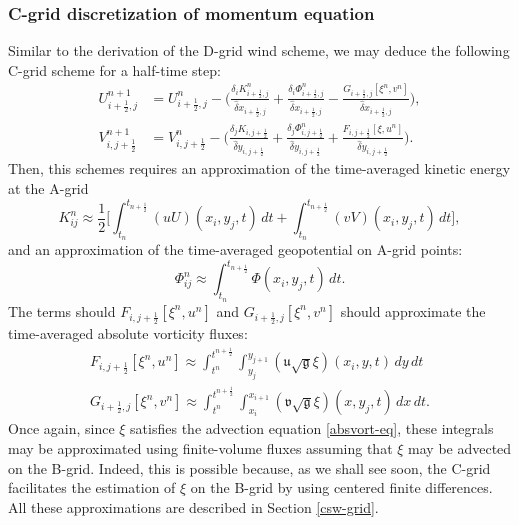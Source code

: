 \subsubsection{C-grid discretization of momentum equation }
Similar to the derivation of the D-grid wind scheme, we may deduce the following C-grid scheme for a half-time step:
\begin{align}
	\label{2d-sweq-cscheme-u}
	{U}_{i+\frac{1}{2},j}^{n+1}&=
	{U}_{i+\frac{1}{2},j}^{n} - \bigg(
	\frac{\delta_i K_{i+\frac{1}{2},j}^n}{\hat{\delta} x_{i+\frac{1}{2},j}}
	+\frac{\delta_i \Phi_{i+\frac{1}{2},j}^n}{\hat{\delta} x_{i+\frac{1}{2},j}} -
    \frac{G_{i+\frac{1}{2},j}[\xi^{n}, v^n]}{\hat{\delta} x_{i+\frac{1}{2},j}}\bigg),\\
	\label{2d-sweq-cscheme-v}
	{V}_{i,j+\frac{1}{2}}^{n+1}&=
	{V}_{i,j+\frac{1}{2}}^{n} - \bigg(
	\frac{\delta_j K_{i,j+\frac{1}{2}}}{\hat{\delta} y_{i,j+\frac{1}{2}}}+
	\frac{\delta_j \Phi_{{i,j+\frac{1}{2}}}^n}{\hat{\delta} y_{i,j+\frac{1}{2}}}
	+
   \frac{F_{i,j+\frac{1}{2}}[\xi, u^n]}{\hat{\delta} y_{i,j+\frac{1}{2}}}\bigg).
\end{align}
Then, this schemes requires an approximation of the time-averaged kinetic energy at the A-grid
\begin{equation}
	\label{ke-agrid}
	K_{ij}^n \approx \frac{1}{2}\bigg[
	\int_{t_{n}}^{t_{n+\frac{1}{2}}} ({u}{U})
	(x_{i}, y_{j}, t) \,dt +
	\int_{t_{n}}^{t_{n+\frac{1}{2}}} ({v}{V})
	(x_{i}, y_{j}, t) \,dt\bigg],
\end{equation}
and an approximation of the time-averaged geopotential on A-grid points:
\begin{equation}
	\label{geop-agrid}
	\Phi_{ij}^n \approx
	\int_{t_{n}}^{t_{n+\frac{1}{2}}} \Phi
	(x_{i}, y_{j}, t) \,dt.
\end{equation}
The terms should $F_{i,j+\frac{1}{2}}[\xi^{n}, u^n]$ and $G_{i+\frac{1}{2},j}[\xi^{n}, v^n] $ should approximate the time-averaged absolute vorticity fluxes:
\begin{align}
	F_{i,j+\frac{1}{2}}[\xi^{n}, u^n] \approx
	\int_{t^n}^{t^{n+\frac{1}{2}}} 
	\int_{y_{j}}^{y_{j+1}} 
	{(\mathfrak{u}\sqrt{\mathfrak{g}}\xi)(x_{i}, y, t)}
	\,dy \,dt \\
	G_{i+\frac{1}{2},j}[\xi^{n}, v^n] \approx
	\int_{t^n}^{t^{n+\frac{1}{2}}} 
	\int_{x_{i}}^{x_{i+1}} 
	{(\mathfrak{v}\sqrt{\mathfrak{g}}\xi)(x, y_{j}, t)}
	\,dx \,dt.
\end{align}
Once again, since $\xi$ satisfies the advection equation \eqref{absvort-eq}, 
these integrals may be approximated using finite-volume fluxes assuming that $\xi$ may be advected on the B-grid.
Indeed, this is possible because, as we shall see soon, the C-grid facilitates the estimation of $\xi$ on the B-grid by using centered finite differences.
All these approximations are described in Section \ref{csw-grid}.

